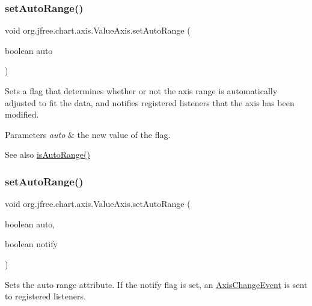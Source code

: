 \subsubsection{\texorpdfstring{set\+Auto\+Range()}{setAutoRange()}\hspace{0.1cm}{\footnotesize\ttfamily [1/2]}}
{\footnotesize\ttfamily void org.\+jfree.\+chart.\+axis.\+Value\+Axis.\+set\+Auto\+Range (\begin{DoxyParamCaption}\item[{boolean}]{auto }\end{DoxyParamCaption})}

Sets a flag that determines whether or not the axis range is automatically adjusted to fit the data, and notifies registered listeners that the axis has been modified.


\begin{DoxyParams}{Parameters}
{\em auto} & the new value of the flag.\\
\hline
\end{DoxyParams}
\begin{DoxySeeAlso}{See also}
\mbox{\hyperlink{classorg_1_1jfree_1_1chart_1_1axis_1_1_value_axis_a6387bb31d194a542d27329ae8e0e84b2}{is\+Auto\+Range()}} 
\end{DoxySeeAlso}
\mbox{\label{classorg_1_1jfree_1_1chart_1_1axis_1_1_value_axis_ab96d2ddbeda94920cb4d5417bf7e41a0}} 
\subsubsection{\texorpdfstring{set\+Auto\+Range()}{setAutoRange()}\hspace{0.1cm}{\footnotesize\ttfamily [2/2]}}
{\footnotesize\ttfamily void org.\+jfree.\+chart.\+axis.\+Value\+Axis.\+set\+Auto\+Range (\begin{DoxyParamCaption}\item[{boolean}]{auto,  }\item[{boolean}]{notify }\end{DoxyParamCaption})\hspace{0.3cm}{\ttfamily [protected]}}

Sets the auto range attribute. If the {\ttfamily notify} flag is set, an \mbox{\hyperlink{}{Axis\+Change\+Event}} is sent to registered listeners.


